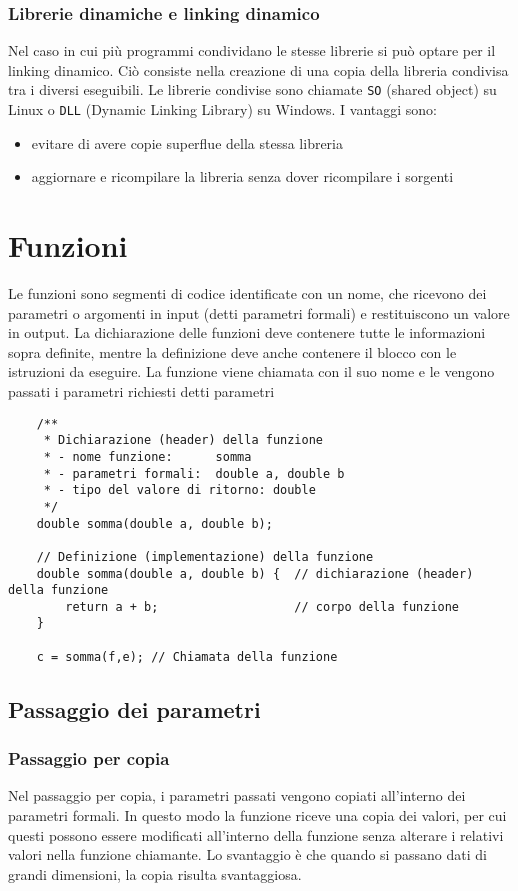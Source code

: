 \documentclass[a4paper]{article}
\begin{document}
\subsubsection*{Librerie dinamiche e linking dinamico}
Nel caso in cui più programmi condividano le stesse librerie si può optare per il linking dinamico. Ciò consiste nella creazione
di una copia della libreria condivisa tra i diversi eseguibili. Le librerie condivise sono chiamate \verb|SO| (shared object) su
Linux o \verb|DLL| (Dynamic Linking Library) su Windows. I vantaggi sono:
\begin{itemize}
	\item evitare di avere copie superflue della stessa libreria
	\item aggiornare e ricompilare la libreria senza dover ricompilare i sorgenti
\end{itemize}

\newpage

\section{Funzioni}
Le funzioni sono segmenti di codice identificate con un nome, che ricevono dei parametri o argomenti in input (detti parametri
formali) e restituiscono un valore in output. La dichiarazione delle funzioni deve contenere tutte le informazioni sopra definite,
mentre la definizione deve anche contenere il blocco con le istruzioni da eseguire. La funzione viene chiamata con il suo nome
e le vengono passati i parametri richiesti detti parametri 
\begin{lstlisting}
	/**
	 * Dichiarazione (header) della funzione
	 * - nome funzione:      somma
	 * - parametri formali:  double a, double b
	 * - tipo del valore di ritorno: double
	 */
	double somma(double a, double b);

	// Definizione (implementazione) della funzione
	double somma(double a, double b) {  // dichiarazione (header) della funzione
		return a + b;                   // corpo della funzione
	}

	c = somma(f,e); // Chiamata della funzione
\end{lstlisting}

\subsection{Passaggio dei parametri}
\subsubsection*{Passaggio per copia}
Nel passaggio per copia, i parametri passati vengono copiati all'interno dei parametri formali. In questo modo la funzione riceve
una copia dei valori, per cui questi possono essere modificati all'interno della funzione senza alterare i relativi valori nella
funzione chiamante. Lo svantaggio è che quando si passano dati di grandi dimensioni, la copia risulta svantaggiosa.
\end{document}

